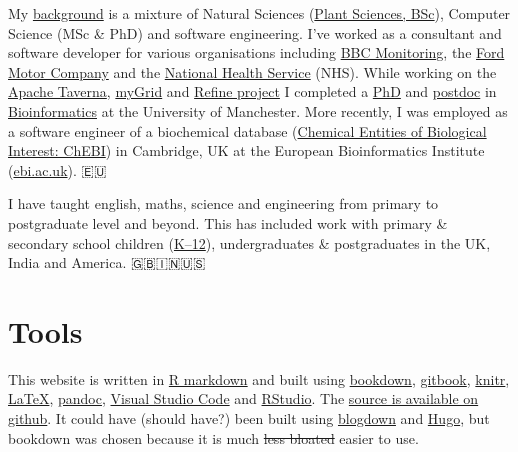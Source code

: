 \documentclass[12pt,]{book}
\begin{document}
My \href{https://uk.linkedin.com/in/duncanhull}{background} is a mixture of Natural Sciences (\href{http://www.plantsciences.manchester.ac.uk/}{Plant Sciences, BSc}), Computer Science (MSc \& PhD) and software engineering. I've worked as a consultant and software developer for various organisations including \href{https://en.wikipedia.org/wiki/BBC_Monitoring}{BBC Monitoring}, the \href{https://en.wikipedia.org/wiki/Ford_Motor_Company}{Ford Motor Company} and the \href{https://en.wikipedia.org/wiki/National_Health_Service}{National Health Service} (NHS). While working on the \href{https://en.wikipedia.org/wiki/Apache_Taverna}{Apache Taverna}, \href{https://en.wikipedia.org/wiki/MyGrid}{myGrid} and \href{http://www.nactem.ac.uk/pathtext/}{Refine project} I completed a \href{https://ethos.bl.uk/OrderDetails.do?uin=uk.bl.ethos.497578}{PhD} and \href{https://en.wikipedia.org/wiki/Postdoctoral_researcher}{postdoc} in \href{https://en.wikipedia.org/wiki/Bioinformatics}{Bioinformatics} at the University of Manchester. More recently, I was employed as a software engineer of a biochemical database (\href{https://www.ebi.ac.uk/chebi/}{Chemical Entities of Biological Interest: ChEBI}) in Cambridge, UK at the European Bioinformatics Institute (\href{https://www.ebi.ac.uk}{ebi.ac.uk}). 🇪🇺

I have taught english, maths, science and engineering from primary to postgraduate level and beyond. This has included work with primary \& secondary school children (\href{https://en.wikipedia.org/wiki/K\%E2\%80\%9312}{K--12}), undergraduates \& postgraduates in the UK, India and America. 🇬🇧🇮🇳🇺🇸

\hypertarget{tools}{%
\section*{Tools}\label{tools}}

This website is written in \href{https://rmarkdown.rstudio.com/}{R markdown} and built using \href{https://bookdown.org}{bookdown}, \href{https://www.gitbook.com}{gitbook}, \href{https://en.wikipedia.org/wiki/Knitr}{knitr}, \href{https://en.wikipedia.org/wiki/LaTeX}{LaTeX}, \href{https://pandoc.org/}{pandoc}, \href{https://code.visualstudio.com/}{Visual Studio Code} and \href{https://www.rstudio.com/}{RStudio}. The \href{https://github.com/dullhunk/hulled}{source is available on github}. It could have (should have?) been built using \href{https://bookdown.org/yihui/blogdown/}{blogdown} and \href{https://gohugo.io}{Hugo}, but bookdown was chosen because it is much \sout{less bloated} easier to use. 🔨
\end{document}
